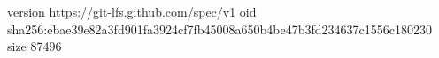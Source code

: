 version https://git-lfs.github.com/spec/v1
oid sha256:ebae39e82a3fd901fa3924cf7fb45008a650b4be47b3fd234637c1556c180230
size 87496
